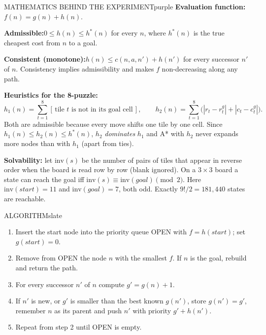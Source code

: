 \documentclass[11pt,a4paper]{article}
\newenvironment{maths}{\begin{secbox}{MATHEMATICS BEHIND THE EXPERIMENT}{purple}}{\end{secbox}}
\newenvironment{algorithm}{\begin{secbox}{ALGORITHM}{slate}}{\end{secbox}}
\begin{document}
\begin{maths}
\textbf{Evaluation function:}\quad $f(n) = g(n) + h(n)$.

\textbf{Admissible:}\quad $0 \le h(n) \le h^{*}(n)$ for every $n$, where $h^{*}(n)$ is the true cheapest cost from $n$ to a goal.

\textbf{Consistent (monotone):}\quad $h(n) \le c(n,a,n') + h(n')$ for every successor $n'$ of $n$. Consistency implies admissibility and makes $f$ non-decreasing along any path.

\textbf{Heuristics for the 8-puzzle:}
\[ h_1(n) = \sum_{t=1}^{8} [\,\text{tile } t \text{ is not in its goal cell}\,], \qquad
   h_2(n) = \sum_{t=1}^{8} \bigl(|r_t - r_t^{g}| + |c_t - c_t^{g}|\bigr). \]
Both are admissible because every move shifts one tile by one cell. Since $h_1(n)\le h_2(n)\le h^{*}(n)$, $h_2$ \emph{dominates} $h_1$ and A* with $h_2$ never expands more nodes than with $h_1$ (apart from ties).

\textbf{Solvability:} let $\mathrm{inv}(s)$ be the number of pairs of tiles that appear in reverse order when the board is read row by row (blank ignored). On a $3\times3$ board a state can reach the goal iff $\mathrm{inv}(s)\equiv \mathrm{inv}(goal) \pmod 2$. Here $\mathrm{inv}(start)=11$ and $\mathrm{inv}(goal)=7$, both odd. Exactly $9!/2 = 181{,}440$ states are reachable.
\end{maths}

\begin{algorithm}
\begin{enumerate}
  \item Insert the start node into the priority queue OPEN with $f = h(start)$; set $g(start)=0$.
  \item Remove from OPEN the node $n$ with the smallest $f$. If $n$ is the goal, rebuild and return the path.
  \item For every successor $n'$ of $n$ compute $g' = g(n) + 1$.
  \item If $n'$ is new, or $g'$ is smaller than the best known $g(n')$, store $g(n') = g'$, remember $n$ as its parent and push $n'$ with priority $g' + h(n')$.
  \item Repeat from step 2 until OPEN is empty.
\end{enumerate}
\end{algorithm}
\end{document}

